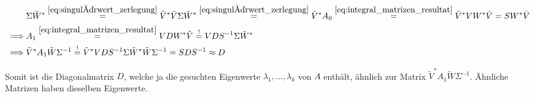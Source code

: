 \begin{align*}
    &
    \Sigma \tilde W^\ast
    \stackrel
    {
        \eqref{eq:singulärwert_zerlegung}
    }{=}
    \tilde V^\ast \tilde V \Sigma \tilde W^\ast
    \stackrel
    {
        \eqref{eq:singulärwert_zerlegung}
    }{=}
    \tilde V^\ast A_0
    \stackrel
    {
        \eqref{eq:integral_matrizen_resultat}
    }{=}
    \tilde V^\ast V W^\ast \hat V
    =
    S W^\ast \hat V \\
    \implies &
    A_1
    \stackrel
    {
        \eqref{eq:integral_matrizen_resultat}
    }{=}
    V D W^\ast \hat V
    \stackrel{!}{=}
    V D S^{-1} \Sigma \tilde W^\ast \\
    \implies &
    \tilde V^\ast A_1 \tilde W \Sigma^{-1}
    \stackrel{!}{=}
    \tilde V^\ast V D S^{-1} \Sigma \tilde W^\ast \tilde W \Sigma^{-1}
    =
    S D S^{-1}
    \approx
    D
\end{align*}

Somit ist die Diagonalmatrix $D$, welche ja die gesuchten Eigenwerte $\lambda_1, \dots, \lambda_k$ von $A$ enthält, ähnlich zur Matrix $\tilde V^\ast A_1 \tilde W \Sigma^{-1}$.
Ähnliche Matrizen haben dieselben Eigenwerte.
